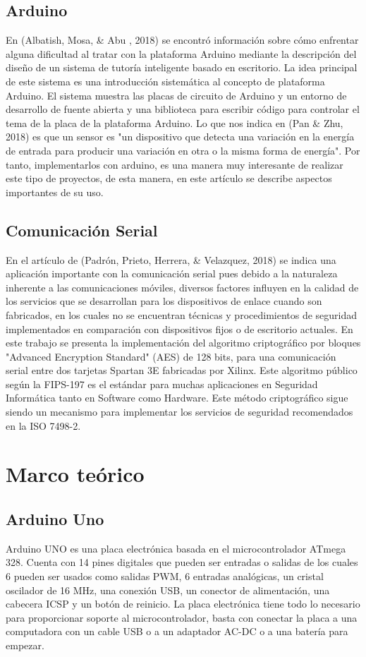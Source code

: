 \documentclass[12pt]{report}
\begin{document}
\subsection{Arduino}
En (Albatish, Mosa, & Abu , 2018) se encontró información sobre cómo enfrentar alguna dificultad al tratar con la plataforma Arduino mediante la descripción del diseño de un sistema de tutoría inteligente basado en escritorio. La idea principal de este sistema es una introducción sistemática al concepto de plataforma Arduino. El sistema muestra las placas de circuito de Arduino y un entorno de desarrollo de fuente abierta y una biblioteca para escribir código para controlar el tema de la placa de la plataforma Arduino.
Lo que nos indica en (Pan & Zhu, 2018) es que un sensor es "un dispositivo que detecta una variación en la energía de entrada para producir una variación en otra o la misma forma de energía". Por tanto, implementarlos con arduino, es una manera muy interesante de realizar este tipo de proyectos, de esta manera, en este artículo se describe aspectos importantes de su uso.\\

\subsection{Comunicación Serial}
En el artículo de (Padrón, Prieto, Herrera, & Velazquez, 2018) se indica una aplicación importante con la comunicación serial pues debido a la naturaleza inherente a las comunicaciones móviles, diversos factores influyen en la calidad de los servicios que se desarrollan para los dispositivos de enlace cuando son fabricados, en los cuales no se encuentran técnicas y procedimientos de seguridad implementados en comparación con dispositivos fijos o de escritorio actuales. En este trabajo se presenta la implementación del algoritmo criptográfico por bloques "Advanced Encryption Standard" (AES) de 128 bits, para una comunicación serial entre dos tarjetas Spartan 3E fabricadas por Xilinx. Este algoritmo público según la FIPS-197 es el estándar para muchas aplicaciones en Seguridad Informática tanto en Software como Hardware. Este método criptográfico sigue siendo un mecanismo para implementar los servicios de seguridad recomendados en la ISO 7498-2.


\section{Marco teórico}
\subsection{Arduino Uno}
Arduino UNO es una placa electrónica basada en el microcontrolador ATmega 328. Cuenta con 14 pines digitales que pueden ser entradas o salidas de los cuales 6 pueden ser usados como salidas PWM, 6 entradas analógicas, un cristal oscilador de 16 MHz, una conexión USB, un conector de alimentación, una cabecera ICSP y un botón de reinicio. La placa electrónica tiene todo lo necesario para proporcionar soporte al microcontrolador, basta con conectar la placa a una computadora con un cable USB o a un adaptador AC-DC o a una batería para empezar.
\end{document}
